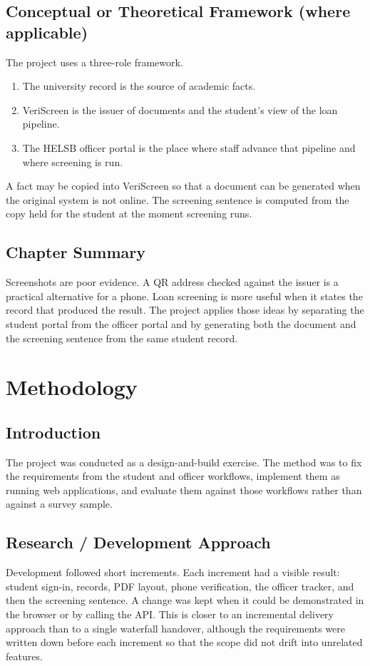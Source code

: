 \documentclass[12pt,a4paper]{report}
\begin{document}
\section{Conceptual or Theoretical Framework (where applicable)}
The project uses a three-role framework.
\begin{enumerate}
    \item The university record is the source of academic facts.
    \item VeriScreen is the issuer of documents and the student's view of the loan pipeline.
    \item The HELSB officer portal is the place where staff advance that pipeline and where screening is run.
\end{enumerate}
A fact may be copied into VeriScreen so that a document can be generated when the original system is not online. The screening sentence is computed from the copy held for the student at the moment screening runs.

\section{Chapter Summary}
Screenshots are poor evidence. A QR address checked against the issuer is a practical alternative for a phone. Loan screening is more useful when it states the record that produced the result. The project applies those ideas by separating the student portal from the officer portal and by generating both the document and the screening sentence from the same student record.

\chapter{Methodology}

\section{Introduction}
The project was conducted as a design-and-build exercise. The method was to fix the requirements from the student and officer workflows, implement them as running web applications, and evaluate them against those workflows rather than against a survey sample.

\section{Research / Development Approach}
Development followed short increments. Each increment had a visible result: student sign-in, records, PDF layout, phone verification, the officer tracker, and then the screening sentence. A change was kept when it could be demonstrated in the browser or by calling the API. This is closer to an incremental delivery approach than to a single waterfall handover, although the requirements were written down before each increment so that the scope did not drift into unrelated features.
\end{document}
